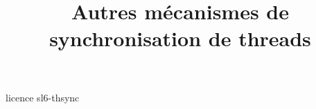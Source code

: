 \documentclass {beamer}
\title {Autres mécanismes de synchronisation de threads}
\begin{document}
 {licence}
 {sl6-thsync}
\end{document}
